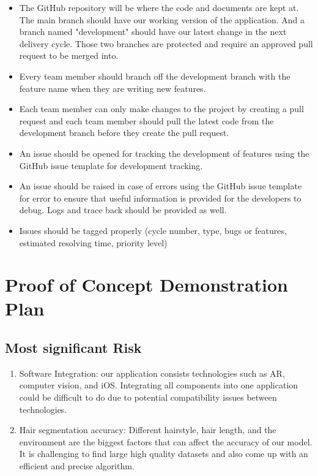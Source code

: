 \documentclass{article}
\begin{document}
\begin{itemize}
    \item The GitHub repository will be where the code and documents are kept at. The main branch should have our working version of the application. And a branch named "development" should have our latest change in the next delivery cycle. Those two branches are protected and require an approved pull request to be merged into.
    \item Every team member should branch off the development branch with the feature name when they are writing new features.
    \item Each team member can only make changes to the project by creating a pull request and each team member should pull the latest code from the development branch before they create the pull request.
    \item An issue should be opened for tracking the development of features using the GitHub issue template for development tracking.
    \item An issue should be raised in case of errors using the GitHub issue template for error to ensure that useful information is provided for the developers to debug. Logs and trace back should be provided as well.
    \item Issues should be tagged properly (cycle number, type, bugs or features, estimated resolving time, priority level)
\end{itemize}

\section{Proof of Concept Demonstration Plan}

\subsection{Most significant Risk}
\begin{enumerate}
    \item Software Integration: our application consists technologies such as AR, computer vision, and iOS. Integrating all components into one application could be difficult to do due to potential compatibility issues between technologies.
    \item Hair segmentation accuracy: Different hairstyle, hair length, and the environment are the biggest factors that can affect the accuracy of our model. It is challenging to find large high quality datasets and also come up with an efficient and precise algorithm.
\end{enumerate}
\end{document}
